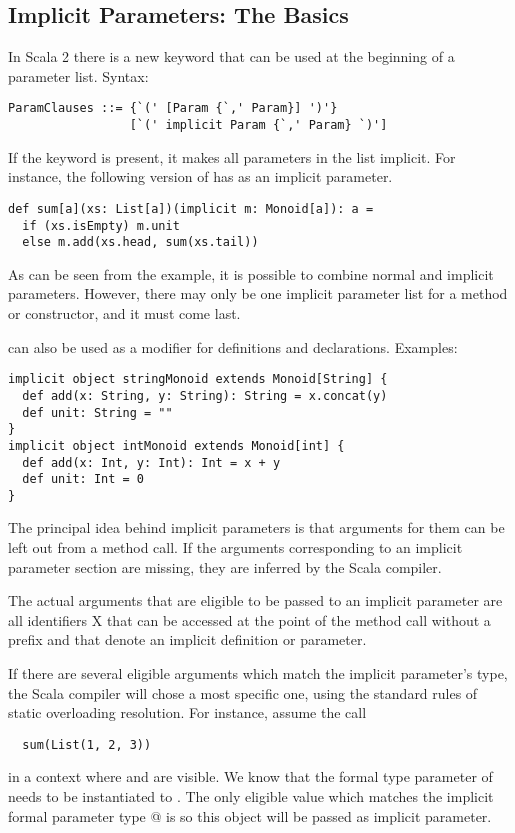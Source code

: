 \documentclass[a4paper,11pt,twoside]{article}
\begin{document}
\subsection*{Implicit Parameters: The Basics}

In Scala 2 there is a new \lstinline@implicit@ keyword that can be
used at the beginning of a parameter list. Syntax:
\begin{lstlisting}
ParamClauses ::= {`(' [Param {`,' Param}] ')'} 
                 [`(' implicit Param {`,' Param} `)']
\end{lstlisting}
If the keyword is present, it makes all parameters in the list
implicit.  
For instance, the following version of \lstinline@sum@ has
\lstinline@m@ as an implicit parameter.
\begin{lstlisting}
def sum[a](xs: List[a])(implicit m: Monoid[a]): a = 
  if (xs.isEmpty) m.unit
  else m.add(xs.head, sum(xs.tail))
\end{lstlisting}
As can be seen from the example, it is possible to combine normal and
implicit parameters. However, there may only be one implicit parameter
list for a method or constructor, and it must come last.

\lstinline@implicit@ can also be used as a modifier for definitions
and declarations. Examples:

\begin{lstlisting}
implicit object stringMonoid extends Monoid[String] {
  def add(x: String, y: String): String = x.concat(y)
  def unit: String = ""
}
implicit object intMonoid extends Monoid[int] {
  def add(x: Int, y: Int): Int = x + y
  def unit: Int = 0
}
\end{lstlisting}

The principal idea behind implicit parameters is that arguments for
them can be left out from a method call. If the arguments
corresponding to an implicit parameter section are missing, they are
inferred by the Scala compiler.

The actual arguments that are eligible to be passed to an implicit
parameter are all identifiers X that can be accessed at the point
of the method call without a prefix and that denote an implicit
definition or parameter.

If there are several eligible arguments which match the implicit
parameter's type, the Scala compiler will chose a most specific one,
using the standard rules of static overloading resolution.
For instance, assume the call
\begin{lstlisting}
  sum(List(1, 2, 3))
\end{lstlisting}
in a context where \lstinline@stringMonoid@ and \lstinline@intMonoid@
are visible.  We know that the formal type parameter \lstinline@a@ of
\lstinline@sum@ needs to be instantiated to \lstinline@Int@. The only
eligible value which matches the implicit formal parameter type
\lstinline@Monoid[Int]@ is \lstinline@intMonoid@ so this object will
be passed as implicit parameter.
\end{document}
